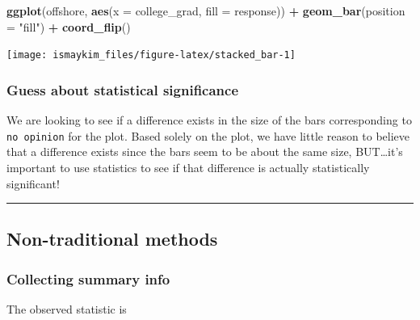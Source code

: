 \documentclass[12pt, krantz2,]{krantz}
\makeatletter
\newenvironment{Shaded}{\begin{snugshade}}{\end{snugshade}}
\newcommand{\DataTypeTok}[1]{\textcolor[rgb]{0.27,0.27,0.27}{#1}}
\newcommand{\KeywordTok}[1]{\textcolor[rgb]{0.27,0.27,0.27}{\textbf{#1}}}
\newcommand{\NormalTok}[1]{#1}
\newcommand{\OperatorTok}[1]{\textcolor[rgb]{0.43,0.43,0.43}{\textbf{#1}}}
\newcommand{\StringTok}[1]{\textcolor[rgb]{0.5,0.5,0.5}{#1}}
\newenvironment{kframe}{%
\medskip{}
\setlength{\fboxsep}{.8em}
 \def\at@end@of@kframe{}%
 \ifinner\ifhmode%
  \def\at@end@of@kframe{\end{minipage}}%
  \begin{minipage}{\columnwidth}%
 \fi\fi%
 \def\FrameCommand##1{\hskip\@totalleftmargin \hskip-\fboxsep
 \colorbox{shadecolor}{##1}\hskip-\fboxsep
     \hskip-\linewidth \hskip-\@totalleftmargin \hskip\columnwidth}%
 \MakeFramed {\advance\hsize-\width
   \@totalleftmargin\z@ \linewidth\hsize
   \@setminipage}}%
 {\par\unskip\endMakeFramed%
 \at@end@of@kframe}
\renewenvironment{Shaded}{\begin{kframe}}{\end{kframe}}
\makeatother
\begin{document}
\begin{Shaded}
\begin{Highlighting}[]
\KeywordTok{ggplot}\NormalTok{(offshore, }\KeywordTok{aes}\NormalTok{(}\DataTypeTok{x =}\NormalTok{ college_grad, }\DataTypeTok{fill =}\NormalTok{ response)) }\OperatorTok{+}
\StringTok{  }\KeywordTok{geom_bar}\NormalTok{(}\DataTypeTok{position =} \StringTok{"fill"}\NormalTok{) }\OperatorTok{+}
\StringTok{  }\KeywordTok{coord_flip}\NormalTok{()}
\end{Highlighting}
\end{Shaded}

\begin{center}\texttt{[image: ismaykim\_files/figure-latex/stacked\_bar-1]} \end{center}

\hypertarget{guess-about-statistical-significance-2}{%
\subsubsection*{Guess about statistical significance}\label{guess-about-statistical-significance-2}}


We are looking to see if a difference exists in the size of the bars corresponding to \texttt{no\ opinion} for the plot. Based solely on the plot, we have little reason to believe that a difference exists since the bars seem to be about the same size, BUT\ldots{}it's important to use statistics to see if that difference is actually statistically significant!

\begin{center}\rule{0.5\linewidth}{\linethickness}\end{center}

\hypertarget{non-traditional-methods-2}{%
\subsection{Non-traditional methods}\label{non-traditional-methods-2}}

\hypertarget{collecting-summary-info}{%
\subsubsection*{Collecting summary info}\label{collecting-summary-info}}


The observed statistic is

\begin{Shaded}
\end{Shaded}
\end{document}
